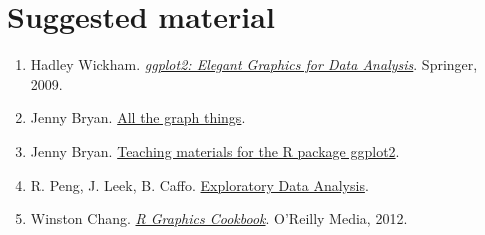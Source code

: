 \documentclass[11pt, oneside]{report}
\begin{document}
\chapter*{Suggested material}
%

\begin{enumerate}[(1)]
\item Hadley Wickham. \href{http://www.amazon.com/ggplot2-Elegant-Graphics-Data-Analysis/dp/0387981403/ref=sr_1_2?ie=UTF8&qid=1461133380&sr=8-2&keywords=ggplot2}{\emph{ggplot2: Elegant Graphics for Data Analysis}}. Springer, 2009.
\item Jenny Bryan. \href{http://stat545.com/graph00_index.html}{All the graph things}.
\item Jenny Bryan. \href{https://github.com/jennybc/ggplot2-tutorial}{Teaching materials for the R package ggplot2}.
\item R. Peng, J. Leek, B. Caffo. \href{https://www.coursera.org/learn/exploratory-data-analysis/}{Exploratory Data Analysis}.
\item Winston Chang. \href{http://www.amazon.com/R-Graphics-Cookbook-Winston-Chang/dp/1449316956/ref=sr_1_3?ie=UTF8&qid=1461135767&sr=8-3&keywords=ggplot2}{\emph{R Graphics Cookbook}}. O'Reilly Media, 2012.
\end{enumerate}

%
%

\newpage

\thispagestyle{empty}
\pagecolor{Olive}\afterpage{\nopagecolor}

\null
\vfill
\end{document}
